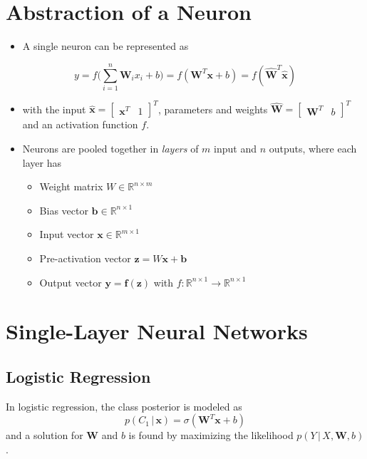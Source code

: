 \documentclass[a4paper, 11pt, accentcolor = tud3b]{tudreport}
\newcommand{\given}{\ensuremath{\,\vert\,}}
\newcommand{\R}{\ensuremath{\mathbb{R}}}
\renewcommand{\vec}[1]{\mathbf{#1}}
\begin{document}
		\section{Abstraction of a Neuron}
			\begin{itemize}
				\item A single neuron can be represented as
			\end{itemize}
			\begin{equation}
				y = f\big( \sum_{i = 1}^{n} \vec{W}_i x_i + b \big) = f(\vec{W}^T \vec{x} + b) = f(\hat{\vec{W}}^T \hat{\vec{x}})
			\end{equation}
			\begin{itemize}
				\item[] with the input \( \hat{\vec{x}} = \begin{bmatrix} \vec{x}^T & 1 \end{bmatrix}^T \), parameters and weights \( \hat{\vec{W}} = \begin{bmatrix} \vec{W}^T & b \end{bmatrix}^T \) and an activation function \(f\).
				\item Neurons are pooled together in \emph{layers} of \(m\) input and \(n\) outputs, where each layer has
					\begin{itemize}
						\item Weight matrix \( W \in \R^{n \times m} \)
						\item Bias vector \( \vec{b} \in \R^{n \times 1} \)
						\item Input vector \( \vec{x} \in \R^{m \times 1} \)
						\item Pre-activation vector \( \vec{z} = W\vec{x} + \vec{b} \)
						\item Output vector \( \vec{y} = \vec{f}(\vec{z}) \) with \( f : \R^{n \times 1} \to \R^{n \times 1} \)
					\end{itemize}
			\end{itemize}

		\section{Single-Layer Neural Networks}
			\subsection{Logistic Regression}
				In logistic regression, the class posterior is modeled as
				\begin{equation}
					p(C_1 \given \vec{x}) = \sigma(\vec{W}^T \vec{x} + b)
				\end{equation}
				and a solution for \(\vec{W}\) and \(b\) is found by maximizing the likelihood \( p(Y \given X, \vec{W}, b) \).
				
\end{document}

